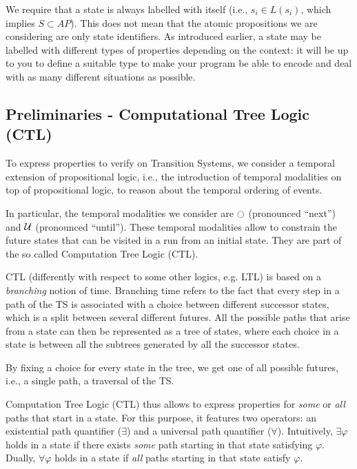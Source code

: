 \documentclass{article}
\begin{document}
We require that a state is always labelled with itself 
(i.e., $s_i \in L(s_i)$, which implies $S \subset AP$). 
This does not mean that the atomic propositions we are considering are only state identifiers. 
As introduced earlier, a state may be labelled with different types of properties depending on the context: 
it will be up to you to define a suitable type to make your program be able to encode and 
deal with as many different situations as possible.


\subsection{Preliminaries - Computational Tree Logic (CTL)}
\label{subsec-ctl}
To express properties to verify on Transition Systems, we consider a temporal extension of propositional logic, 
i.e., the introduction of temporal modalities on top of propositional logic, to reason about the temporal ordering
of events.

In particular, the temporal modalities we consider are $\ocircle$ (pronounced ``next'') 
and $\mathbin{\mathcal{U}}$ (pronounced ``until''). These temporal modalities allow to constrain the future states 
that can be visited in a run from an initial state. They are part of the so called Computation Tree Logic (CTL).

CTL (differently with respect to some other logics, e.g. LTL) is based on a \emph{branching} notion of time. 
Branching time refers to the fact that every step in a path of the TS is associated with a choice between 
different successor states, which is a split between several different futures. 
All the possible paths that arise from a state can then be represented
as a tree of states, where each choice in a state is between all the subtrees generated by all the successor states.

By fixing a choice for every state in the tree, we get one of all possible futures, 
i.e., a single path, a traversal of the TS.

Computation Tree Logic (CTL) thus allows to express properties for \emph{some} or \emph{all} paths that start in a state. 
For this purpose, it features two operators: an existential path quantifier ($\exists$) and a universal path quantifier ($\forall$). 
Intuitively, $\exists \varphi$ holds in a state if there exists \emph{some} path starting in that state satisfying $\varphi$. 
Dually, $\forall \varphi$ holds in a state if \emph{all} paths starting in that state satisfy $\varphi$.
\end{document}
